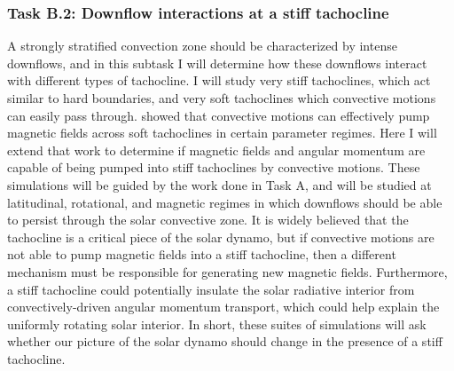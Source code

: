 \documentclass[aasms,11pt, longbibliography]{article}
\begin{document}
\subsubsection{Task B.2: Downflow interactions at a stiff tachocline}
\label{sct:taskB2}
A strongly stratified convection zone should be characterized by intense downflows, and in this subtask I will determine how these downflows interact with different types of tachocline.
I will study very stiff tachoclines, which act similar to hard boundaries, and very soft tachoclines which convective motions can easily pass through.
\citet{tobias&all1998} showed that convective motions can effectively pump magnetic fields across soft tachoclines in certain parameter regimes.
Here I will extend that work  to determine if magnetic fields and angular momentum are capable of being pumped into stiff tachoclines by convective motions.
These simulations will be guided by the work done in Task A, and will be studied at latitudinal, rotational, and magnetic regimes in which downflows should be able to persist through the solar convective zone.
It is widely believed that the tachocline is a critical piece of the solar dynamo, but if convective motions are not able to pump magnetic fields into a stiff tachocline, then a different mechanism must be responsible for generating new magnetic fields.
Furthermore, a stiff tachocline could potentially insulate the solar radiative interior from convectively-driven angular momentum transport, which could help explain the uniformly rotating solar interior.
In short, these suites of simulations will ask whether our picture of the solar dynamo should change in the presence of a stiff tachocline.
\end{document}
